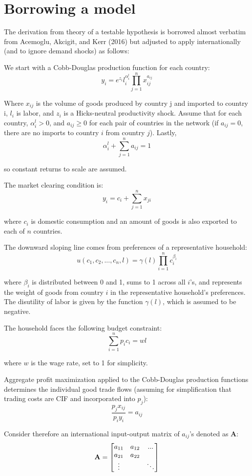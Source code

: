 \documentclass[10pt,letterpaper]{article}
\begin{document}
\section{Borrowing a model}

The derivation from theory of a testable hypothesis is borrowed almost verbatim from Acemoglu, Akcigit, and Kerr (2016) but adjusted to apply internationally (and to ignore demand shocks) as follows:

We start with a Cobb-Douglas production function for each country:
$$ y_i = e^{z_i}l_i^{\alpha_i^l} \prod_{j=1}^{n} x_{ij}^{a_{ij}}$$

Where $x_{ij}$ is the volume of goods produced by country j and imported to country i, $l_i$ is labor, and $z_i$ is a Hicks-neutral productivity shock. Assume that for each country, $\alpha_i^l >0$, and $a_{ij} \geq 0$ for each pair of countries in the network (if $a_{ij} = 0$, there are no imports to country $i$ from country $j$). Lastly,
$$ \alpha_i^l + \sum_{j=1}^{n} a_{ij} = 1$$

so constant returns to scale are assumed. 

The market clearing condition is:
$$y_i = c_i + \sum_{j=1}^{n} x_{ji}$$

where $c_i$ is domestic consumption and an amount of goods is also exported to each of $n$ countries.

The downward sloping line comes from preferences of a representative household:
$$ u(c_1,c_2,...,c_n,l) = \gamma (l) \prod_{i=1}^{n} c_i^{\beta_i}$$

where $\beta_i$ is distributed between 0 and 1, sums to 1 across all $i$'s, and represents the weight of goods from country $i$ in the representative household's preferences. The disutility of labor is given by the function $\gamma (l)$, which is assumed to be negative.

The household faces the following budget constraint:
$$ \sum_{i=1}^{n} p_ic_i = wl$$

where $w$ is the wage rate, set to 1 for simplicity.

Aggregate profit maximization applied to the Cobb-Douglas production functions determines the individual good trade flows (assuming for simplification that trading costs are CIF and incorporated into $p_j$):
$$ \frac{p_jx_{ij}}{p_iy_i} = a_{ij}$$

Consider therefore an international input-output matrix of $a_{ij}$'s denoted as \textbf{A}:
\begin{equation*}
\text{\textbf{A}} = \begin{bmatrix}
		a_{11} & a_{12} & ... \\
		a_{21} & a_{22} &  \\
		\vdots &  & \ddots 
		\end{bmatrix}
\end{equation*}		
\end{document}
